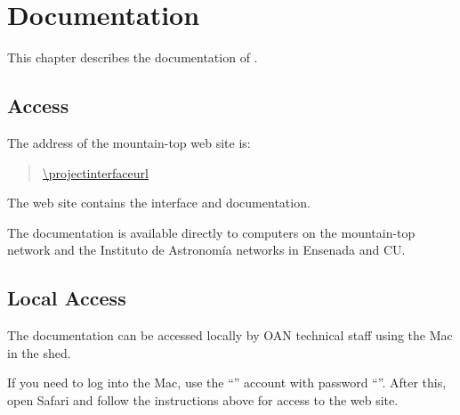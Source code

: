 \chapter{Documentation}
\label{chapter:documentation}

This chapter describes the documentation of {\projectname}.

\section{Access}

The address of the {\projectname} mountain-top web site is:
\begin{quotation}
\url{\projectinterfaceurl}
\end{quotation}

The web site contains the interface and documentation.

The documentation is available directly to computers on the mountain-top network and the Instituto de Astronomía networks in Ensenada and CU.

\section{Local Access}
\label{section:interface-access-mac}

The documentation can be accessed locally by OAN technical staff using the Mac in the shed.

If you need to log into the Mac, use the “{\projectaccount}” account with password “{\projectaccount}”. After this, open Safari and follow the instructions above for access to the web site.

